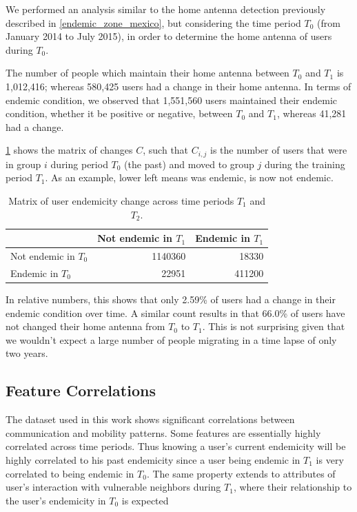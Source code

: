We performed an analysis similar to the home antenna detection previously described in \cref{endemic_zone_mexico}, but considering the time period $T_0$ (from January 2014 to July 2015),
in order to determine the home antenna of users during $T_0$.

The number of people which maintain their home antenna between $T_0$ and $T_1$ is 1,012,416;
whereas 580,425 users had a change in their home antenna.
In terms of endemic condition, we observed that 1,551,560 users maintained their endemic condition, whether it be positive or negative, between $T_0$ and $T_1$, whereas 41,281 had a change.


\cref{tab:changes}
shows the matrix of changes $C$, such that $C_{i, j}$ is the number of users that were in group $i$ during period $T_0$ (the past) and moved to group $j$ during the training period $T_1$.
As an example, lower left means was endemic, is now not endemic.

\begin{table}[ht]
	\caption{Matrix of user endemicity change across time periods $T_1$ and $T_2$.}\label{tab:changes}
	\centering
	\begin{tabular}{l r r }
		\toprule
		& Not endemic in $T_1$ & Endemic in $T_1$ \\
		\midrule
		Not endemic in $T_0$ & 1140360 & 18330   \\
		Endemic in $T_0$       & 22951    & 411200 \\
		\bottomrule
	\end{tabular}
\end{table}

In relative numbers, this shows that only 2.59\% of users had a change in their endemic condition over time.
A similar count results in that 66.0\% of users have not changed their home antenna from $T_0$ to $T_1$.
This is not surprising given that we wouldn't expect a large number of people migrating in a time lapse of only two years.



\subsection{Feature Correlations}
\label{subsection:feature_correlations} %


The dataset used in this work shows significant correlations between communication and mobility patterns.
Some features are essentially highly correlated across time periods.
Thus knowing a user's current endemicity will be highly correlated to his past endemicity since a user being endemic in $T_1$ is very correlated to being endemic in $T_0$.
The same property extends to attributes of user's interaction with vulnerable neighbors during $T_1$, where their relationship to the user's endemicity in $T_0$ is expected

